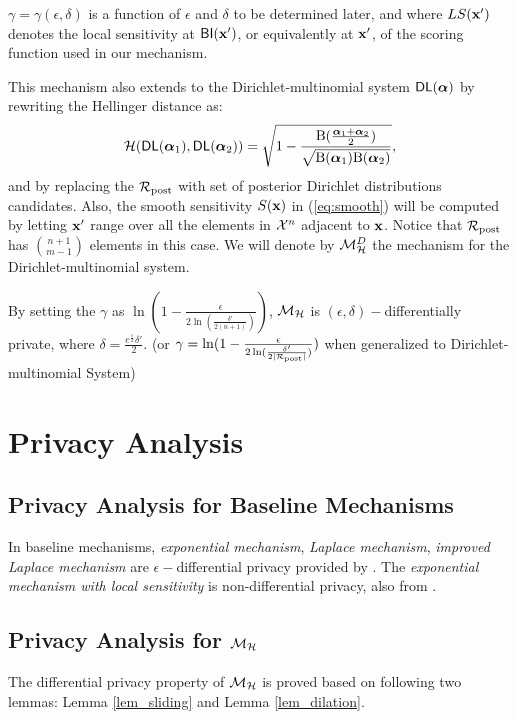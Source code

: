 \documentclass{article}
\begin{document}
$\gamma = \gamma(\epsilon, \delta)$ is a function of $\epsilon$ and $\delta$ to
be determined later, and where $LS(\textbf{x}')$ denotes the local
sensitivity at $\mathsf{BI}(\textbf{x}')$, or equivalently at $\textbf{x}'$,
of the scoring function used in our mechanism.

This mechanism also extends to the Dirichlet-multinomial system $\mathsf{DL}(\boldsymbol{\alpha})$ by rewriting the Hellinger distance as:
\[
  \mathcal{H}(\mathsf{DL}(\boldsymbol{\alpha}_1), \mathsf{DL}(\boldsymbol{\alpha}_2)) = \sqrt{1 - \frac{\textup{B}(\frac{\boldsymbol{\alpha}_1 + \boldsymbol{\alpha}_2}{2})}{\sqrt{\textup{B}(\boldsymbol{\alpha}_1) \textup{B}(\boldsymbol{\alpha}_2)}}},
\]
and by replacing the $\mathcal{R}_{\textup{post}}$ with set of posterior Dirichlet
distributions candidates. Also, the smooth sensitivity $S(\textbf{x})$
in (\ref{eq:smooth}) will be computed by letting $\textbf{x}'$ range
over all the elements in $\mathcal{X}^{n}$ adjacent to $\textbf{x}$. Notice
that $\mathcal{R}_{\textup{post}}$ has $\binom{n + 1}{m - 1}$ elements in this case. We
will denote by $\mathcal{M}^{D}_{\mathcal{H}}$ the mechanism for the
Dirichlet-multinomial system.

By setting the $\gamma$ as $\ln(1 - \frac{\epsilon}{2 \ln (\frac{\delta'}{2 (n + 1)})})$, $\mathcal{M}_{\mathcal{H}}$ is $(\epsilon, \delta) -$differentially private, where $\delta = \frac{e^{\frac{\epsilon}{2}} \delta'}{2}$. (or $\gamma = \ln(1 - \frac{\epsilon}{2 \ln (\frac{\delta'}{2 |\mathcal{R}_{\textup{post}}|})})$ when generalized to Dirichlet-multinomial System)


\section{Privacy Analysis}

\subsection{Privacy Analysis for Baseline Mechanisms}
In baseline mechanisms, \emph{exponential mechanism}, \emph{Laplace mechanism}, \emph{improved Laplace mechanism} are $\epsilon-$differential privacy provided by \cite{dwork2014algorithmic}. The \emph{exponential mechanism with local sensitivity} is non-differential privacy, also from \cite{dwork2014algorithmic}.

\subsection{Privacy Analysis for $\mathcal{M}_{\mathcal{H}}$}

The differential privacy property of $\mathcal{M}_{\mathcal{H}}$ is proved based on following two lemmas: Lemma \ref{lem_sliding} and Lemma \ref{lem_dilation}.\\
\end{document}
